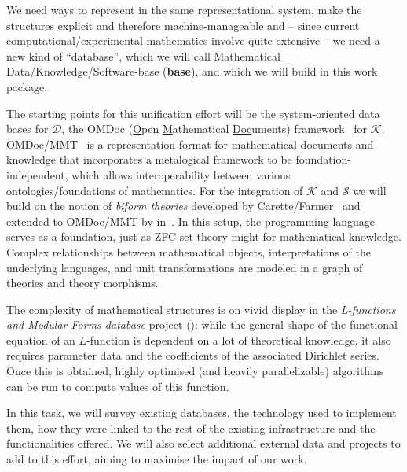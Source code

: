 \begin{workpackage}[id=dksbases,%
  title=Data/Knowledge/Software-Bases,lead=FAU,
  ZHRM=12,JURM=12,FAURM=34,UWRM=25,SARM=10,LLRM=2,PSRM=25]
\begin{wpdescription}
  We need ways to represent \DKS in the same representational system, make the \DKS
  structures explicit and therefore machine-manageable and -- since current
  computational/experimental mathematics involve quite extensive \DKS -- we need a new
  kind of ``database'', which we will call Mathematical Data/Knowledge/Software-base
  (\textbf{\DKS base}), and which we will build in this work package.

  The starting points for this unification effort will be the system-oriented data bases
  for $\mathcal{D}$, the OMDoc (\underline{O}pen \underline{M}athematical
  \underline{Doc}uments) framework~\cite{Kohlhase:OMDoc1.2} for $\mathcal{K}$.
  OMDoc/MMT~\cite{RabKoh:WSMSML13} is a representation format for mathematical documents
  and knowledge that incorporates a metalogical framework to be foundation-independent,
  which allows interoperability between various ontologies/foundations of mathematics. For
  the integration of $\mathcal{K}$ and $\mathcal{S}$ we will build on the notion of
  \emph{biform theories} developed by Carette/Farmer~\cite{Farmer:btc07} and extended to
  OMDoc/MMT by  in~\cite{KohManRab:aumftg13}. In this setup, the programming
  language serves as a foundation, just as ZFC set theory might for mathematical
  knowledge. Complex relationships between mathematical objects, interpretations of the
  underlying languages, and unit transformations are modeled in a graph of theories and
  theory morphisms.

  The complexity of mathematical \DKS structures is on vivid display in the
  \emph{L-functions and Modular Forms database} project (\LMFDB): while the general shape
  of the functional equation of an $L$-function is dependent on a lot of theoretical
  knowledge, it also requires parameter data and the coefficients of the associated
  Dirichlet series. Once this is obtained, highly optimised (and heavily parallelizable)
  algorithms can be run to compute values of this function.
\end{wpdescription}

\begin{tasklist}
\begin{task}[title={Survey of existing \DKS bases, Formulation of requirements},
  id=data-assessment,lead=ZH,partners={JU,SA,UW,US},wphases=0-3,PM=4,issue=123]
  In this task, we will survey existing databases, the technology used to implement them,
  how they were linked to the rest of the existing infrastructure and the functionalities
  offered. We will also select additional external data and projects to add to this
  effort, aiming to maximise the impact of our work.


\end{task}
\end{tasklist}
\end{workpackage}
